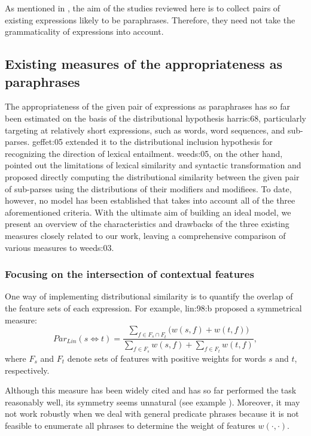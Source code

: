 \documentclass[english]{jnlp_1.4}
\renewcommand{\cite}{}
\newcommand{\newcite}{}
\begin{document}
As mentioned in , the aim of the studies reviewed here is
to collect pairs of existing expressions likely to be paraphrases.
Therefore, they need not take the grammaticality of expressions into
account.

\subsection{Existing measures of the appropriateness as paraphrases}
\label{ssec:existing}

The appropriateness of the given pair of expressions as paraphrases
has so far been estimated on the basis of the distributional
hypothesis \cite{harris:68}, particularly targeting at relatively
short expressions, such as words, word sequences, and sub-parses.
\newcite{geffet:05} extended it to the distributional inclusion
hypothesis for recognizing the direction of lexical entailment.
\newcite{weeds:05}, on the other hand, pointed out the limitations of
lexical similarity and syntactic transformation and proposed directly
computing the distributional similarity between the given pair of
sub-parses using the distributions of their modifiers and modifiees.
To date, however, no model has been established that takes into
account all of the three aforementioned criteria.  With the ultimate
aim of building an ideal model, we present an overview of the
characteristics and drawbacks of the three existing measures closely
related to our work, leaving a comprehensive comparison of various
measures to \cite{weeds:03}.

\subsubsection{Focusing on the intersection of contextual features}

One way of implementing distributional similarity is to quantify the
overlap of the feature sets of each expression.
For example, \newcite{lin:98:b} proposed a symmetrical measure:
\begin{equation}
\mathit{Par_{Lin}}(s\Leftrightarrow t) = \frac{\sum_{f\in F_{s}\cap
    F_{t}}\bigl(w(s,f) + w(t,f)\bigr)}{\sum_{f\in F_{s}} w(s,f) +
  \sum_{f\in F_{t}} w(t,f)},\label{eq:lin}
\end{equation}
where $F_{s}$ and $F_{t}$ denote sets of features with positive
weights for words $s$ and $t$, respectively.

Although this measure has been widely cited and has so far performed
the task reasonably well, its symmetry seems unnatural (see example
).  Moreover, it may not work robustly when we deal
with general predicate phrases because it is not feasible to enumerate
all phrases to determine the weight of features $w(\cdot,\cdot)$.
\end{document}
